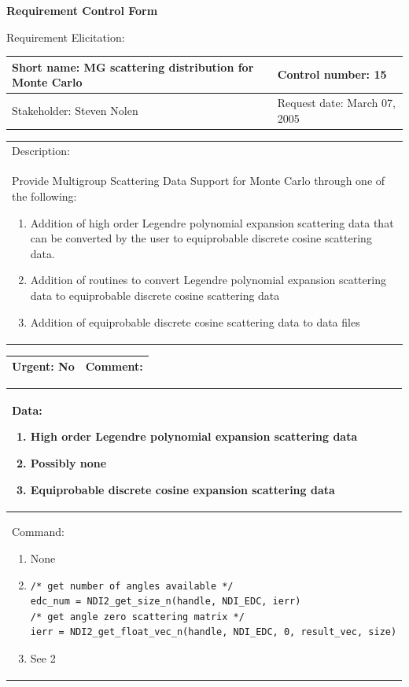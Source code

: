 \begin{center}\Large\bf
Requirement Control Form
\end{center}
\vspace{24pt}

Requirement Elicitation:

\begin{tabular}{|p{211pt}|p{211pt}|} \hline
Short name: MG scattering distribution for Monte Carlo & Control number: 15\\ \hline
Stakeholder: Steven Nolen & Request date: March 07, 2005\\
\end{tabular}
\begin{tabular}{|p{433pt}|} \hline
Description: \\ 
Provide Multigroup Scattering Data Support for Monte Carlo through one
of the following:
\begin{enumerate}
\item Addition of high order Legendre polynomial expansion scattering
data that can be converted by the user to equiprobable discrete
cosine scattering data.
\item Addition of routines to convert Legendre polynomial expansion
scattering data to equiprobable discrete cosine scattering data
\item Addition of equiprobable discrete cosine scattering data to data
files
\end{enumerate}
\\ \hline
\end{tabular} 
\begin{tabular}{|p{211pt}|p{211pt}|} \hline
Urgent: No & Comment: \\ \hline
\end{tabular}

\vspace{12pt}

\begin{tabular}{|p{433pt}|} \hline
Data: 
\begin{enumerate}
\item High order Legendre polynomial expansion scattering data
\item Possibly none
\item Equiprobable discrete cosine expansion scattering data
\end{enumerate} \\ \hline
Command: 
\begin{enumerate}
\item None
\item
\begin{verbatim}
/* get number of angles available */
edc_num = NDI2_get_size_n(handle, NDI_EDC, ierr)
/* get angle zero scattering matrix */
ierr = NDI2_get_float_vec_n(handle, NDI_EDC, 0, result_vec, size)
\end{verbatim} 
\item See 2 
\end{enumerate} \\ \hline

\end{tabular}
\vspace{24pt}

